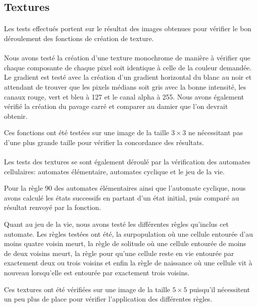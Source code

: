 \documentclass[a4paper]{article}
\begin{document}
\subsection{Textures}
\label{texturestest}
\paragraph{}
Les tests effectués portent sur le résultat des images obtenues pour vérifier le bon déroulement des fonctions de création de texture.

\paragraph{}
Nous avons testé la création d'une texture monochrome de manière à vérifier que chaque composante de chaque pixel soit identique à celle de la couleur demandée. Le gradient est testé avec la création d'un gradient horizontal du blanc au noir et attendant de trouver que les pixels médians soit gris avec la bonne intensité, les canaux rouge, vert et bleu à 127 et le canal alpha à 255. Nous avons également vérifié la création du pavage carré et comparer au damier que l'on devrait obtenir.

Ces fonctions ont été testées sur une image de la taille $3 \times 3$ ne nécessitant pas d'une plus grande taille pour vérifier la concordance des résultats.

\paragraph{}
Les tests des textures se sont également déroulé par la vérification des automates cellulaires: automates élémentaire, automates cyclique et le jeu de la vie.

Pour la règle 90 des automates élémentaires ainsi que l'automate cyclique, nous avons calculé les états successifs en partant d'un état initial, puis comparé au résultat renvoyé par la fonction.

Quant au jeu de la vie, nous avons testé les différentes règles qu'inclus cet automate. Les règles testées ont été, la surpopulation où une cellule entourée d'au moins quatre voisin meurt, la règle de solitude où une cellule entourée de moins de deux voisins meurt, la règle pour qu'une cellule reste en vie entourée par exactement deux ou trois voisins et enfin la règle de naissance où une cellule vit à nouveau lorsqu'elle est entourée par exactement trois voisins.

Ces textures ont été vérifiées sur une image de la taille $5 \times 5$ puisqu'il nécessitent un peu plus de place pour vérifier l'application des différentes règles.
\end{document}
